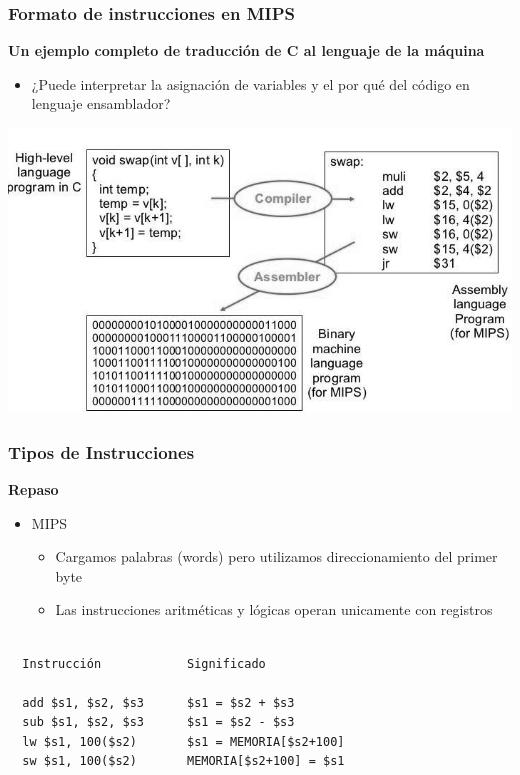 \documentclass[aspectratio=169,compress]{beamer}
\begin{document}
\begin{footnotesize}
\begin{frame}
\frametitle{Formato de instrucciones en MIPS}
\begin{center}\textbf{Un ejemplo completo de traducción de C al lenguaje de la máquina}\end{center}
\begin{itemize}
\item ¿Puede interpretar la asignación de variables y el por qué del código en lenguaje ensamblador?
\end{itemize}
	\begin{center}
\includegraphics[scale=0.4]{images/below2.jpg} 
	\end{center}
\end{frame}




\begin{frame}[fragile]
\frametitle{Tipos de Instrucciones}
\begin{center}\textbf{Repaso}\end{center}

\begin{itemize}
\item MIPS
\begin{itemize}
\item Cargamos palabras (words) pero utilizamos direccionamiento del primer byte
\item Las instrucciones aritméticas y lógicas operan unicamente con registros
\end{itemize}
\end{itemize}
\begin{verbatim}

  Instrucción            Significado

  add $s1, $s2, $s3      $s1 = $s2 + $s3
  sub $s1, $s2, $s3      $s1 = $s2 - $s3
  lw $s1, 100($s2)       $s1 = MEMORIA[$s2+100]
  sw $s1, 100($s2)       MEMORIA[$s2+100] = $s1
\end{verbatim}
\end{frame}



\end{footnotesize}
\end{document}
